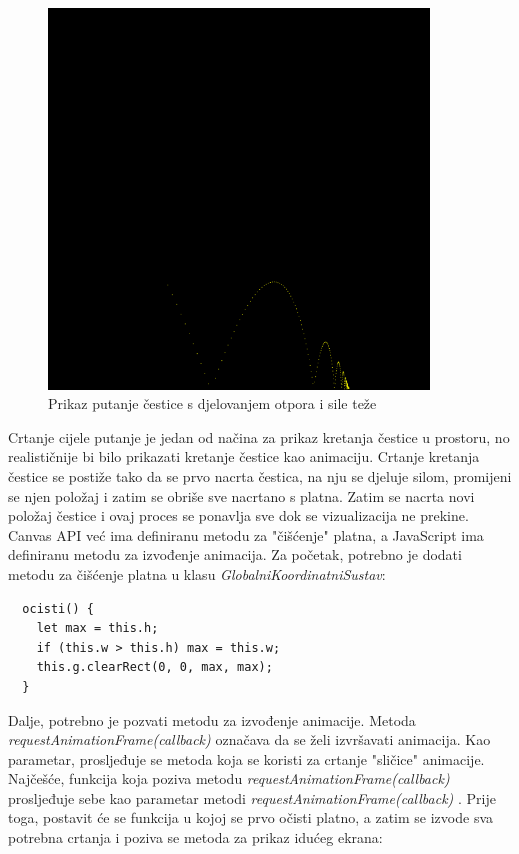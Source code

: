 \documentclass{foi}
\begin{document}
\begin{figure}[H]
    \centering
    \includegraphics[width=0.9\textwidth]{slike/13_PutanjaCesticeOtporSilaTeza.png}
    \captionsetup{justification=centering}
    \caption{Prikaz putanje čestice s djelovanjem otpora i sile teže}
\label{fig:PutanjaCesticeOtporSilaTeza}
\end{figure}

Crtanje cijele putanje je jedan od načina za prikaz kretanja čestice u prostoru, no realističnije bi bilo prikazati kretanje čestice kao animaciju. Crtanje kretanja čestice se postiže tako da se prvo nacrta čestica, na nju se djeluje silom, promijeni se njen položaj i zatim se obriše sve nacrtano s platna. Zatim se nacrta novi položaj čestice i ovaj proces se ponavlja sve dok se vizualizacija ne prekine. Canvas API već ima definiranu metodu za "čišćenje" platna, a JavaScript ima definiranu metodu za izvođenje animacija. Za početak, potrebno je dodati metodu za čišćenje platna u klasu \textit{GlobalniKoordinatniSustav}:

\begin{verbatim}
  ocisti() {
    let max = this.h;
    if (this.w > this.h) max = this.w;
    this.g.clearRect(0, 0, max, max);
  }
\end{verbatim}

Dalje, potrebno je pozvati metodu za izvođenje animacije. Metoda \textit{requestAnimationFrame(callback)} označava da se želi izvršavati animacija. Kao parametar, prosljeđuje se metoda koja se koristi za crtanje "sličice" animacije. Najčešće, funkcija koja poziva metodu \textit{requestAnimationFrame(callback)} prosljeđuje sebe kao parametar metodi \textit{requestAnimationFrame(callback)} \parencite{RequestAnimationFrame}. Prije toga, postavit će se funkcija u kojoj se prvo očisti platno, a zatim se izvode sva potrebna crtanja i poziva se metoda za prikaz idućeg ekrana:
\end{document}
